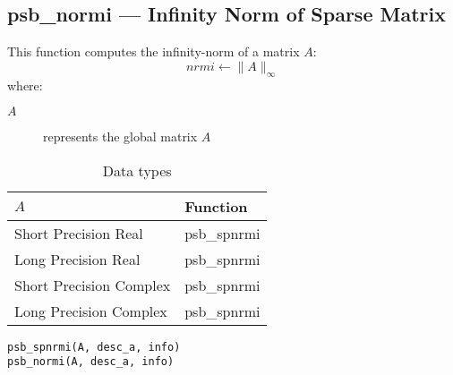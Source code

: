 %
%


\clearpage\subsection*{psb\_normi --- Infinity Norm of Sparse Matrix}

This function computes the infinity-norm of a matrix $A$:\\

\[ nrmi \leftarrow \|A\|_\infty \]
where:
\begin{description}
\item[$A$] represents the global matrix $A$
\end{description}

\begin{table}[h]
\begin{center}
\begin{tabular}{ll}
\hline
$A$ & {\bf Function}\\
\hline
Short Precision Real & psb\_spnrmi \\
Long Precision Real & psb\_spnrmi \\
Short Precision Complex & psb\_spnrmi \\
Long Precision Complex & psb\_spnrmi \\
\hline
\end{tabular}
\end{center}
\caption{Data types\label{tab:f90nrmi}}
\end{table}

\begin{verbatim}
psb_spnrmi(A, desc_a, info)
psb_normi(A, desc_a, info)
\end{verbatim}

